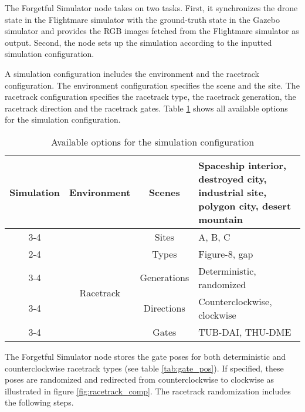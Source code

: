 The Forgetful Simulator node takes on two tasks.
First, it synchronizes the
drone state in the Flightmare simulator with the
ground-truth state in the Gazebo simulator and 
provides the RGB images fetched from the Flightmare simulator
as output.
Second, the node sets up the simulation
according to the inputted 
simulation configuration.

A simulation configuration 
includes the environment and the racetrack configuration.
The environment configuration specifies
the scene and the site.
The racetrack configuration
specifies the 
racetrack type, the racetrack generation,
the racetrack direction and the racetrack gates.
Table \ref{tab:sim_config_opts} shows all available options for the simulation configuration.
\begin{table}[h]
    \caption{Available options for the simulation configuration
    \label{tab:sim_config_opts}}
    \centering
    \begin{tabular}{|c|c|c|p{6cm}|} \hline
        \multirow{8}{*}{Simulation} 
        &\multirow{4}{*}{Environment}   
        &\multirow{3}{*}{Scenes}
        &Spaceship interior, destroyed city, industrial site, polygon city, desert mountain    
        \\\cline{3-4}
        &
        &Sites
        &A, B, C
        \\\cline{2-4}
        &\multirow{4}{*}{Racetrack}
        &Types
        &Figure-8, gap                                                                         \\\cline{3-4}
        &
        &Generations
        &Deterministic, randomized
        \\\cline{3-4}
        &
        &Directions
        &Counterclockwise, clockwise
        \\\cline{3-4}
        &
        &Gates
        &TUB-DAI, THU-DME
        \\\hline
    \end{tabular}
\end{table}
The Forgetful Simulator node stores 
the gate poses for both 
deterministic and counterclockwise
racetrack types
(see table \ref{tab:gate_pos}).
If specified,
these poses are randomized
and redirected from counterclockwise to clockwise
as illustrated in figure \ref{fig:racetrack_comp}.
The racetrack randomization 
includes the following steps.
